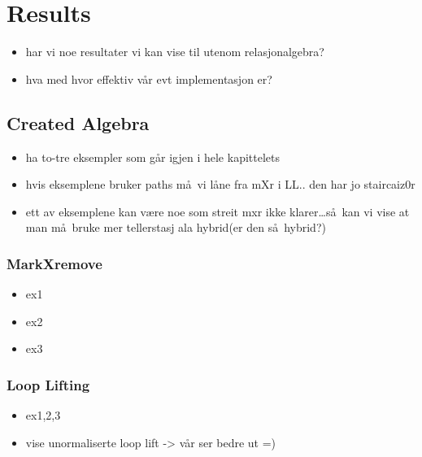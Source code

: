 \chapter{Results}
\label{chapter:results}
\begin{itemize}
  \item har vi noe resultater vi kan vise til utenom relasjonalgebra?
  \item hva med hvor effektiv v\aa r evt implementasjon er?
\end{itemize}

\section{Created Algebra}
\begin{itemize}
  \item ha to-tre eksempler som g\aa r igjen i hele kapittelets
  \item hvis eksemplene bruker paths m\aa~vi l\aa ne fra mXr i LL.. den har jo staircaiz0r
  \item ett av eksemplene kan v\ae re noe som streit mxr ikke klarer\ldots s\aa~kan vi vise at man m\aa~bruke mer
  tellerstasj ala hybrid(er den s\aa~hybrid?)
\end{itemize}

\subsection{MarkXremove}
\label{sect:results:createMxR}
\begin{itemize}
  \item ex1
  \item ex2
  \item ex3
\end{itemize}

\subsection{Loop Lifting}
\label{sect:results:createLL}
\begin{itemize}
  \item ex1,2,3
  \item vise unormaliserte loop lift -> v\aa r ser bedre ut =) 
\end{itemize}






